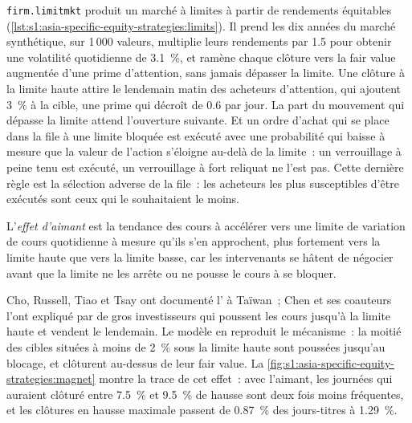\texttt{firm.limitmkt} produit un marché à limites à partir de rendements équitables (\cref{lst:s1:asia-specific-equity-strategies:limits}). Il prend les dix années
du marché synthétique, sur 1\,000 valeurs, multiplie leurs rendements par 1.5 pour obtenir une volatilité quotidienne de 3.1~\%, et ramène chaque clôture vers la fair value augmentée d'une
prime d'attention, sans jamais dépasser la limite. Une clôture à la limite haute attire le lendemain matin des acheteurs d'attention, qui ajoutent 3~\% à la cible, une prime
qui décroît de 0.6 par jour. La part du mouvement qui dépasse la limite attend l'ouverture suivante. Et un ordre d'achat qui se place dans la file à une limite bloquée est exécuté
avec une probabilité qui baisse à mesure que la valeur de l'action s'éloigne au-delà de la limite~: un verrouillage à peine tenu est exécuté, un verrouillage à fort reliquat ne l'est pas.
Cette dernière règle est la sélection adverse de la file~: les acheteurs les plus susceptibles d'être exécutés sont ceux qui le souhaitaient le moins.

\begin{definition}\label{def:s1:asia-specific-equity-strategies:magnet}
L'\emph{effet d'aimant} est la tendance des cours à accélérer vers une limite de variation de cours quotidienne à mesure qu'ils s'en approchent, plus fortement
vers la limite haute que vers la limite basse, car les intervenants se hâtent de négocier avant que la limite ne les arrête ou ne pousse le cours à se bloquer.
\end{definition}

Cho, Russell, Tiao et Tsay ont documenté l' à Taïwan~; Chen et ses coauteurs l'ont expliqué par de gros investisseurs qui poussent les cours jusqu'à la limite haute
et vendent le lendemain. Le modèle en reproduit le mécanisme~: la moitié des cibles situées à moins de 2~\% sous la limite haute sont poussées jusqu'au blocage, et clôturent au-dessus
de leur fair value. La \cref{fig:s1:asia-specific-equity-strategies:magnet} montre la trace de cet effet~: avec l'aimant, les journées qui auraient clôturé entre 7.5~\% et 9.5~\% de hausse
sont deux fois moins fréquentes, et les clôtures en hausse maximale passent de 0.87~\% des jours-titres à 1.29~\%.

